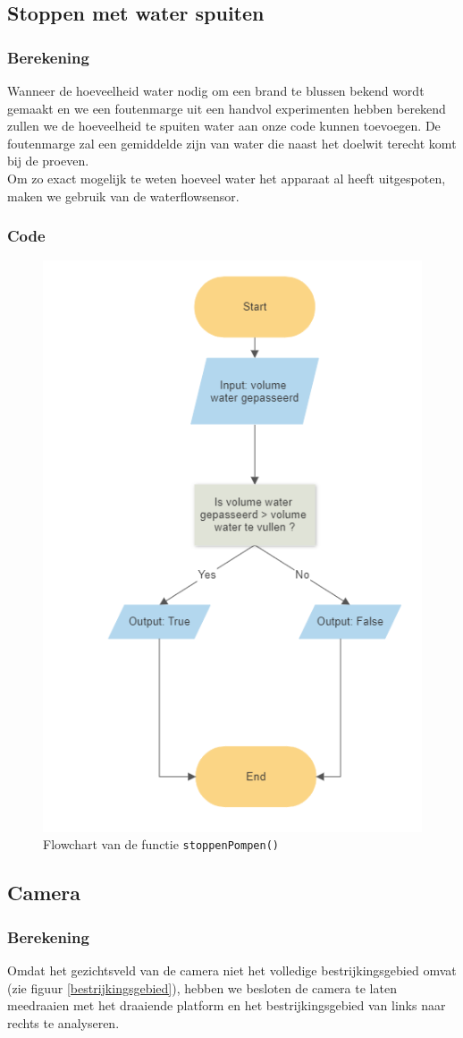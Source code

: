 \documentclass[kulak]{kulakarticle} %
\begin{document}
	\subsection{Stoppen met water spuiten}
		\subsubsection{Berekening}
			Wanneer de hoeveelheid water nodig om een brand te blussen bekend wordt gemaakt en we een foutenmarge uit een handvol experimenten hebben berekend zullen we de hoeveelheid te spuiten water aan onze code kunnen toevoegen. De foutenmarge zal een gemiddelde zijn van water die naast het doelwit terecht komt bij de proeven. \\
			Om zo exact mogelijk te weten hoeveel water het apparaat al heeft uitgespoten, maken we gebruik van de waterflowsensor.



		\subsubsection{Code}
			\begin{figure} [!h]
				\centering                 
				\includegraphics[width = .3 \textwidth]{flowchart_stoppenPompen}
			\cprotect\caption{Flowchart van de functie \verb|stoppenPompen()|}
			\end{figure}





	\subsection{Camera}
		\subsubsection{Berekening}
			Omdat het gezichtsveld van de camera niet het volledige bestrijkingsgebied omvat (zie figuur \ref{bestrijkingsgebied}), hebben we besloten de camera te laten meedraaien met het draaiende platform en het bestrijkingsgebied van links naar rechts te analyseren. \\
\end{document}
